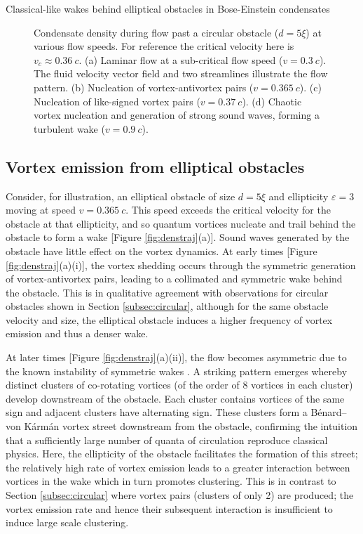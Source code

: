 \begin{chapter}{\label{cha:wake}Classical-like wakes behind elliptical obstacles in Bose-Einstein condensates}
\begin{figure}
  \caption{\label{fig:denstypes} Condensate density during flow past a circular obstacle ($d = 5\xi$) at various flow speeds. For reference the critical velocity here is $v_c \approx 0.36~c$.  (a) Laminar flow at a sub-critical flow speed ($v=0.3~c$).  The fluid velocity vector field and two streamlines illustrate the flow pattern. (b) Nucleation of vortex-antivortex pairs ($v=0.365~c$).  (c) Nucleation of like-signed vortex pairs ($v=0.37~c$). (d)  Chaotic vortex nucleation and generation of strong sound waves, forming a turbulent wake ($v=0.9~c$).}
\end{figure}

\subsection{Vortex emission from elliptical obstacles}
Consider, for illustration, an elliptical obstacle of size $d=5\xi$ and ellipticity $\varepsilon=3$ moving at speed $v=0.365~c$.  This speed exceeds the critical velocity for the obstacle at that ellipticity, and so quantum vortices nucleate and trail behind the obstacle to form a wake [Figure \ref{fig:denstraj}(a)].  Sound waves generated by the obstacle have little effect on the vortex dynamics. At early times [Figure \ref{fig:denstraj}(a)(i)], the vortex shedding occurs through the symmetric generation of vortex-antivortex pairs, leading to a collimated and symmetric wake behind the obstacle.  This is in qualitative agreement with observations for circular obstacles \cite{frisch92,nore93,win00,huepe00} shown in Section \ref{subsec:circular}, although for the same obstacle velocity and size, the elliptical obstacle induces a higher frequency of vortex emission and thus a denser wake. 

At later times [Figure \ref{fig:denstraj}(a)(ii)], the flow becomes asymmetric due to the known instability of symmetric wakes \cite{nore93}.  A striking pattern emerges whereby distinct clusters of co-rotating vortices (of the order of 8 vortices in each cluster) develop downstream of the obstacle.  Each cluster contains vortices of the same sign and adjacent clusters have alternating sign.  These clusters form a B\'enard--von K\'arm\'an vortex street downstream from the obstacle, confirming the intuition that a sufficiently large number of quanta of circulation reproduce classical physics.  Here, the ellipticity of the obstacle facilitates the formation of this street; the relatively high rate of vortex emission leads to a greater interaction between vortices in the wake which in turn promotes clustering.  This is in contrast to Section \ref{subsec:circular} where vortex pairs (clusters of only 2) are produced; the vortex emission rate and hence their subsequent interaction is insufficient to induce large scale clustering.


\end{chapter}
